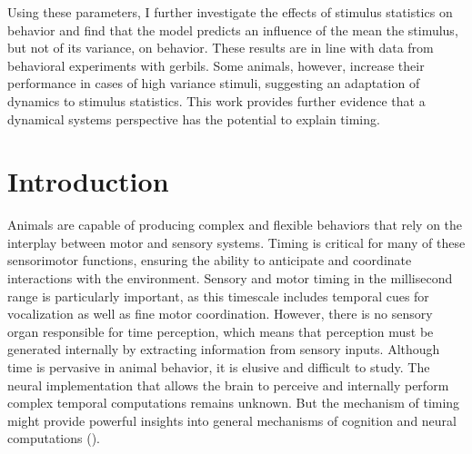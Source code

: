 \documentclass[10pt, a4paper]{article}
\begin{document}
Using these parameters, I further investigate the effects of stimulus statistics on behavior and find that the model predicts an influence of the mean the stimulus, but not of its variance, on behavior.
These results are in line with data from behavioral experiments with gerbils. Some animals, however, increase their performance in cases of high variance stimuli, suggesting an adaptation of dynamics to stimulus statistics.
This work provides further evidence that a dynamical systems perspective has the potential to explain timing.



\clearpage

\tableofcontents

\pagebreak
{}
\section{Introduction}
Animals are capable of producing complex and flexible behaviors that rely on the interplay between motor and sensory systems.
Timing is critical for many of these sensorimotor functions, ensuring the ability to anticipate and coordinate interactions with the environment.
Sensory and motor timing in the millisecond range is particularly important, as this timescale includes temporal cues for vocalization as well as fine motor coordination.
However, there is no sensory organ responsible for time perception, which means that perception must be generated internally by extracting information from sensory inputs.
Although time is pervasive in animal behavior, it is elusive and difficult to study. The neural implementation that allows the brain to perceive and internally perform complex temporal computations remains unknown.
But the mechanism of timing might provide powerful insights into general mechanisms of cognition and neural computations (\cite{Issa2020}).
\end{document}
